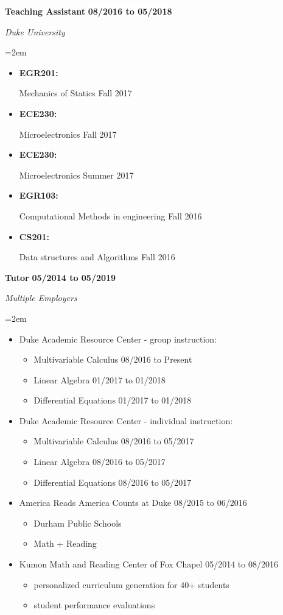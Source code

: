 \documentclass[paper=letter,fontsize=11pt]{scrartcl} %
\newcommand{\sepspace}{\vspace*{1em}}		%
\newcommand{\EducationEntry}[4]{
		\noindent \textbf{#1} \hfill      %
		\colorbox{White}{%
			\bf 
			\parbox{10em}{%
			\hfill\color{Black}#2}} \par  %
		\noindent \textit{#3} \par        %
		\noindent\hangindent=2em\hangafter=0 \small #4 %
		\normalsize \par}
\newcommand{\WorkEntry}[4]{				  %
		\noindent \textbf{#1} \hfill      %
		\colorbox{White}{\bf \color{Black}#2} \par  %
		\noindent \textit{#3} \par              %
		\noindent\hangindent=2em\hangafter=0 \small #4 %
		\normalsize \par}
\begin{document}
\sepspace
\WorkEntry{Teaching Assistant}{08/2016 to 05/2018}{Duke University}
{
	\begin{itemize}
		\item \parbox[t]{4.5em}{\bf EGR201:} Mechanics of Statics \hfill Fall 2017
		\item \parbox[t]{4.5em}{\bf ECE230:} Microelectronics	\hfill Fall 2017
		\item \parbox[t]{4.5em}{\bf ECE230:} Microelectronics	\hfill Summer 2017
		\item \parbox[t]{4.5em}{\bf EGR103:} Computational Methods in engineering 	\hfill Fall 2016
		\item \parbox[t]{4.5em}{\bf CS201: } Data structures and Algorithms 	\hfill Fall 2016
	\end{itemize}
}

\sepspace
\WorkEntry{Tutor}{05/2014 to 05/2019}{Multiple Employers}
{	
	\begin{itemize}
	\setlength\itemsep{0em}
	\item Duke Academic Resource Center - group instruction:
		\begin{itemize}
			  \setlength\itemsep{0em}
			\item Multivariable Calculus \hfill 08/2016 to Present
			\item Linear Algebra 		 \hfill 01/2017 to 01/2018
			\item Differential Equations \hfill 01/2017 to 01/2018
		\end{itemize}
	\item Duke Academic Resource Center - individual instruction:
		\begin{itemize}
			  \setlength\itemsep{0em}
			\item Multivariable Calculus \hfill 08/2016 to 05/2017
			\item Linear Algebra 		 \hfill 08/2016 to 05/2017
			\item Differential Equations \hfill 08/2016 to 05/2017
		\end{itemize}
	\item America Reads America Counts at Duke \hfill 08/2015 to 06/2016
		\begin{itemize}
			\item Durham Public Schools
			\item Math + Reading
		\end{itemize}
	\item Kumon Math and Reading Center of Fox Chapel \hfill 05/2014 to 08/2016
		\begin{itemize}
			\item personalized curriculum generation for 40+ students
			\item student performance evaluations
		\end{itemize}
	\end{itemize}
}
\end{document}
